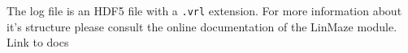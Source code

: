 \documentclass[11pt,a4paper]{article}
\newcommand{\param}[1]{\item \texttt{#1} -}
\newcommand{\enote}[1]{\textcolor{RubineRed}{#1}}
\begin{document}
%
The log file is an HDF5 file with a \texttt{.vrl} extension. For more information about it's structure please consult the online documentation of the LinMaze module. \enote{Link to docs}



\end{document}
